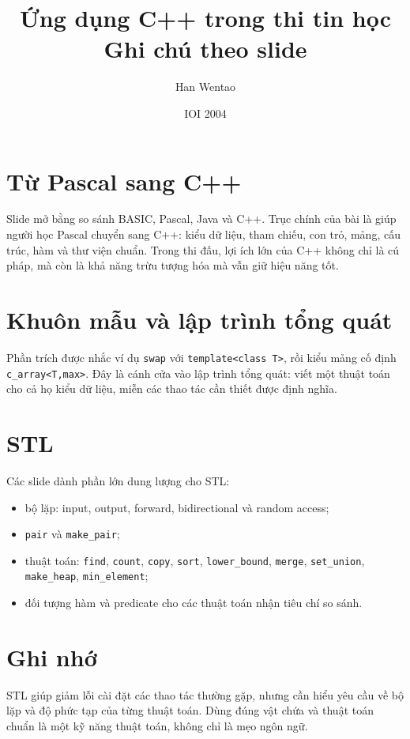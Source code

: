 \documentclass[11pt]{article}
\title{Ứng dụng C++ trong thi tin học\\{\large Ghi chú theo slide}}
\author{Han Wentao}
\date{IOI 2004}
\begin{document}
\maketitle


\section{Từ Pascal sang C++}

Slide mở bằng so sánh BASIC, Pascal, Java và C++. Trục chính của bài là giúp
người học Pascal chuyển sang C++: kiểu dữ liệu, tham chiếu, con trỏ, mảng,
cấu trúc, hàm và thư viện chuẩn. Trong thi đấu, lợi ích lớn của C++ không chỉ
là cú pháp, mà còn là khả năng trừu tượng hóa mà vẫn giữ hiệu năng tốt.

\section{Khuôn mẫu và lập trình tổng quát}

Phần trích được nhắc ví dụ \texttt{swap} với \texttt{template<class T>}, rồi
kiểu mảng cố định \texttt{c\_array<T,max>}. Đây là cánh cửa vào lập trình
tổng quát: viết một thuật toán cho cả họ kiểu dữ liệu, miễn các thao tác cần
thiết được định nghĩa.

\section{STL}

Các slide dành phần lớn dung lượng cho STL:
\begin{itemize}
  \item bộ lặp: input, output, forward, bidirectional và random access;
  \item \texttt{pair} và \texttt{make\_pair};
  \item thuật toán: \texttt{find}, \texttt{count}, \texttt{copy},
  \texttt{sort}, \texttt{lower\_bound}, \texttt{merge},
  \texttt{set\_union}, \texttt{make\_heap}, \texttt{min\_element};
  \item đối tượng hàm và predicate cho các thuật toán nhận tiêu chí so sánh.
\end{itemize}

\section{Ghi nhớ}

STL giúp giảm lỗi cài đặt các thao tác thường gặp, nhưng cần hiểu yêu cầu về
bộ lặp và độ phức tạp của từng thuật toán. Dùng đúng vật chứa và thuật toán
chuẩn là một kỹ năng thuật toán, không chỉ là mẹo ngôn ngữ.
\end{document}

